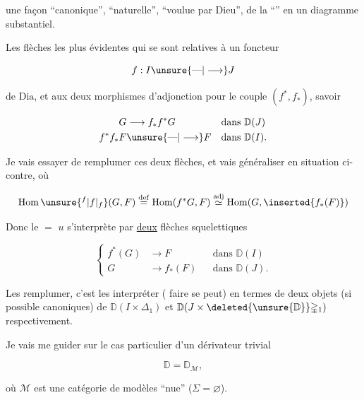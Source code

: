 une façon ``canonique'', ``naturelle'', ``voulue par Dieu'', de la ``'' en un diagramme substantiel.

Les flèches les plus évidentes qui se  sont  relatives à un foncteur

\[
f:I\unsure{\text{---}|\longrightarrow}J
\]

de $\mathrm{Dia}$, et aux deux morphismes d'adjonction pour le couple $(f^*,f_*)$, savoir


\[
\begin{aligned}
G&\longrightarrow f_*f^*G&&\text{dans }\mathbb D(J)\\
f^*f_*F&\unsure{\text{---}|\longrightarrow}F&&\text{dans }\mathbb D(I).
\end{aligned}
\]

Je vais essayer de remplumer ces deux flèches, et vais généraliser en  situation ci-contre, où


\[
\operatorname{Hom}\unsure{{}^{f}|f|{}_{f}}(G,F)\overset{\mathrm{def}}{=}\operatorname{Hom}(f^*G,F)
\overset{\mathrm{adj}}{\simeq}\operatorname{Hom}(G,\inserted{f_*(F)})
\]

Donc le $=$ $u$ s'interprète par \uline{deux} flèches squelettiques

\[
\left\{\begin{aligned}
f^*(G)&\longrightarrow F&&\text{dans }\mathbb D(I)\\
G&\longrightarrow f_*(F)&&\text{dans }\mathbb D(J).
\end{aligned}\right.
\tag*{(1)}
\]

Les remplumer, c'est les interpréter ( faire se peut) en termes de deux objets (si possible canoniques) de $\mathbb D(I\times\mathbb{\Delta}_1)$ et $\mathbb D(J\times\deleted{\unsure{\mathbb D}}\mathbb{\Delta}_1)$ respectivement.

Je vais me guider sur le cas particulier d'un dérivateur trivial

\[
\mathbb D=\mathbb D_{\mathcal M},
\]

où $\mathcal M$ est une catégorie de modèles ``nue'' ($\Sigma=\varnothing$).
